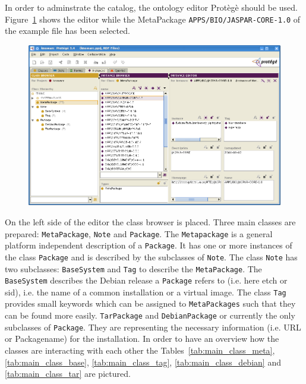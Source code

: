 In order to adminstrate the catalog, the ontology editor Prot\`eg\`e should be used. Figure~\ref{fig:protege_example} shows the
editor while the MetaPackage \texttt{APPS/BIO/JASPAR-CORE-1.0} of the example file has been selected.
\begin{figure}
  \begin{center}
    \includegraphics[width=\textwidth]{images/protege_JASPAR.png}
    \label{fig:protege_example}
  \end{center}
\end{figure}
On the left side of the editor the class browser is placed. Three main classes are prepared: \texttt{MetaPackage}, \texttt{Note} and \texttt{Package}.
The \texttt{Metapackage} is a general platform independent description of a \texttt{Package}. 
It has one or more instances of the class \texttt{Package} and is
described by the subclasses of \texttt{Note}. The class \texttt{Note} has two subclasses: \texttt{BaseSystem} 
and \texttt{Tag} to describe the \texttt{MetaPackage}. The \texttt{BaseSystem} describes the Debian release a \texttt{Package} refers to
(i.e. here etch or sid), i.e. the name of a common installation or a virtual image.
The class \texttt{Tag} provides small keywords which can be assigned to \texttt{MetaPackages} such that
they can be found more easily.  \texttt{TarPackage} and \texttt{DebianPackage} or currently the only subclasses of \texttt{Package}.
They are representing the necessary information (i.e. URL or Packagename) for the installation. In order to have an overview how the 
classes are interacting with each other the Tables~\ref{tab:main_class_meta},\ref{tab:main_class_base}, \ref{tab:main_class_tag},
\ref{tab:main_class_debian} and \ref{tab:main_class_tar} are pictured.

